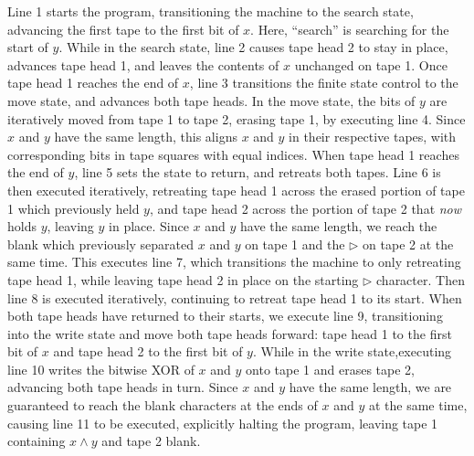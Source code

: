 Line 1 starts the program, transitioning the machine to the search state, advancing the first tape to the first bit of $x$.  Here, ``search'' is searching for the start of $y$.  While in the search state, line 2 causes tape head 2 to stay in place, advances tape head 1, and leaves the contents of $x$ unchanged on tape 1.  Once tape head 1 reaches the end of $x$, line 3 transitions the finite state control to the move state, and advances both tape heads. In the move state, the bits of $y$ are iteratively moved from tape 1 to tape 2, erasing tape 1, by executing line 4.  Since $x$ and $y$ have the same length, this aligns $x$ and $y$ in their respective tapes, with corresponding bits in tape squares with equal indices.  When tape head 1 reaches the end of $y$, line 5 sets the state to return, and retreats both tapes.  Line 6 is then executed iteratively, retreating tape head 1 across the erased portion of tape 1 which previously held $y$, and tape head 2 across the portion of tape 2 that \textit{now}  holds $y$, leaving $y$ in place.  Since $x$ and $y$ have the same length, we reach the blank which previously separated $x$ and $y$ on tape 1 and the $\triangleright$ on tape 2 at the same time.  This executes line 7, which transitions the machine to only retreating tape head 1, while leaving tape head 2 in place on the starting $\triangleright$ character.  Then line 8 is executed iteratively, continuing to retreat tape head 1 to its start.  When both tape heads have returned to their starts, we execute line 9, transitioning into the write state and move both tape heads forward: tape head 1 to the first bit of $x$ and tape head 2 to the first bit of $y$.  While in the write state,executing  line 10 writes the bitwise XOR of $x$ and $y$ onto tape 1 and erases tape 2, advancing both tape heads in turn.  Since $x$ and $y$ have the same length, we are guaranteed to reach the blank characters at the ends of $x$ and $y$ at the same time, causing line 11 to be executed, explicitly halting the program, leaving tape 1 containing $x\wedge y$ and tape 2 blank.

